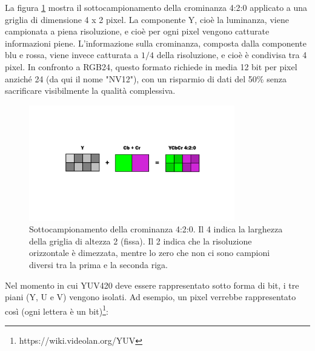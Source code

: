 
La figura \ref{fig:diff_yuv420} mostra il sottocampionamento della crominanza 4:2:0 applicato a una griglia di dimensione 4 x 2 pixel. La componente Y, cioè la luminanza, viene campionata a piena risoluzione, e cioè per ogni pixel vengono catturate informazioni piene. L'informazione sulla crominanza, composta dalla componente blu e rossa\footnotemark{}, viene invece catturata a $1/4$ della risoluzione, e cioè è condivisa tra 4 pixel. In confronto a RGB24, questo formato richiede in media 12 bit per pixel anziché 24 (da qui il nome "NV12"), con un risparmio di dati del 50\% senza sacrificare visibilmente la qualità complessiva.


\begin{figure}[htbp]
	\centering
	
	\includegraphics[width=0.8\textwidth]{res/yuv420.pdf}
	
	\caption{Sottocampionamento della crominanza 4:2:0. Il 4 indica la larghezza della griglia di altezza 2 (fissa). Il 2 indica che la risoluzione orizzontale è dimezzata, mentre lo zero che non ci sono campioni diversi tra la prima e la seconda riga.}
	\label{fig:diff_yuv420}
\end{figure}

Nel momento in cui YUV420 deve essere rappresentato sotto forma di bit, i tre piani (Y, U e V) vengono isolati. Ad esempio, un pixel verrebbe rappresentato così (ogni lettera è un bit)\footnote{https://wiki.videolan.org/YUV}:


